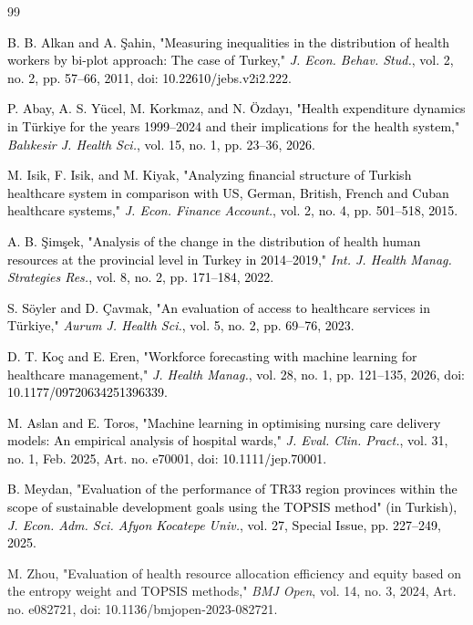 \documentclass[final, 9pt, twocolumn]{saucis}
\newcommand{\rev}[1]{\textcolor{black}{#1}}
\begin{document}
\begin{thebibliography}{99}


 \rev{B. B. Alkan and A. Şahin, "Measuring inequalities in the distribution of health workers by bi-plot approach: The case of Turkey," \emph{J. Econ. Behav. Stud.}, vol. 2, no. 2, pp. 57--66, 2011, doi: 10.22610/jebs.v2i2.222.}

 \rev{P. Abay, A. S. Yücel, M. Korkmaz, and N. Özdayı, "Health expenditure dynamics in Türkiye for the years 1999--2024 and their implications for the health system," \emph{Balıkesir J. Health Sci.}, vol. 15, no. 1, pp. 23--36, 2026.}

 \rev{M. Isik, F. Isik, and M. Kiyak, "Analyzing financial structure of Turkish healthcare system in comparison with US, German, British, French and Cuban healthcare systems," \emph{J. Econ. Finance Account.}, vol. 2, no. 4, pp. 501--518, 2015.}

 \rev{A. B. Şimşek, "Analysis of the change in the distribution of health human resources at the provincial level in Turkey in 2014--2019," \emph{Int. J. Health Manag. Strategies Res.}, vol. 8, no. 2, pp. 171--184, 2022.}

 \rev{S. Söyler and D. Çavmak, "An evaluation of access to healthcare services in Türkiye," \emph{Aurum J. Health Sci.}, vol. 5, no. 2, pp. 69--76, 2023.}

 \rev{D. T. Koç and E. Eren, "Workforce forecasting with machine learning for healthcare management," \emph{J. Health Manag.}, vol. 28, no. 1, pp. 121--135, 2026, doi: 10.1177/09720634251396339.}

 \rev{M. Aslan and E. Toros, "Machine learning in optimising nursing care delivery models: An empirical analysis of hospital wards," \emph{J. Eval. Clin. Pract.}, vol. 31, no. 1, Feb. 2025, Art. no. e70001, doi: 10.1111/jep.70001.}

 \rev{B. Meydan, "Evaluation of the performance of TR33 region provinces within the scope of sustainable development goals using the TOPSIS method" (in Turkish), \emph{J. Econ. Adm. Sci. Afyon Kocatepe Univ.}, vol. 27, Special Issue, pp. 227--249, 2025.}

 M. Zhou, "Evaluation of health resource allocation efficiency and equity based on the entropy weight and TOPSIS methods," \emph{BMJ Open}, vol. 14, no. 3, 2024, Art. no. e082721, doi: 10.1136/bmjopen-2023-082721.


\end{thebibliography}
\end{document}
